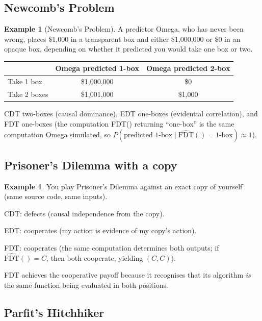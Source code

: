 \documentclass[11pt,a4paper]{article}
\theoremstyle{definition}
\newtheorem{example}[theorem]{Example}
\theoremstyle{remark}
\begin{document}
\subsection{Newcomb's Problem}

\begin{example}[Newcomb's Problem]
A predictor Omega, who has never been wrong, places \$1{,}000 in a
transparent box and either \$1{,}000{,}000 or \$0 in an opaque box,
depending on whether it predicted you would take one box or two.

\medskip
\begin{center}
\begin{tabular}{l|cc}
  & Omega predicted 1-box & Omega predicted 2-box \\
\hline
Take 1 box & \$1{,}000{,}000 & \$0 \\
Take 2 boxes & \$1{,}001{,}000 & \$1{,}000 \\
\end{tabular}
\end{center}
\medskip

\noindent
CDT two-boxes (causal dominance), EDT one-boxes (evidential correlation),
and FDT one-boxes (the computation FDT() returning ``one-box'' is the
same computation Omega simulated, so $P(\text{predicted 1-box} \mid
\widehat{\text{FDT}}() = \text{1-box}) \approx 1$).
\end{example}

\subsection{Prisoner's Dilemma with a copy}

\begin{example}
You play Prisoner's Dilemma against an exact copy of yourself (same
source code, same inputs).

CDT: defects (causal independence from the copy).

EDT: cooperates (my action is evidence of my copy's action).

FDT: cooperates (the same computation determines both outputs; if
$\widehat{\text{FDT}}() = C$, then both cooperate, yielding $(C,C)$).

\medskip
FDT achieves the cooperative payoff because it recognises that its
algorithm \emph{is} the same function being evaluated in both positions.
\end{example}

\subsection{Parfit's Hitchhiker}
\end{document}
